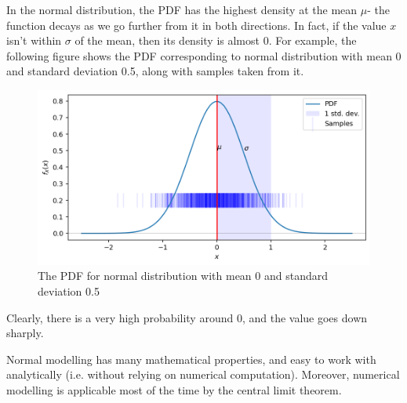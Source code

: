 \documentclass[a4paper, openany]{memoir}
\begin{document}
In the normal distribution, the PDF has the highest density at the mean $\mu$- the function decays as we go further from it in both directions. In fact, if the value $x$ isn't within $\sigma$ of the mean, then its density is almost 0. For example, the following figure shows the PDF corresponding to normal distribution with mean 0 and standard deviation 0.5, along with samples taken from it.
\begin{figure}[H]
    \centering
    \includegraphics[scale=0.5]{src/5.16 pdf normal distribution.png}
    \caption{The PDF for normal distribution with mean 0 and standard deviation 0.5}
\end{figure}
\noindent Clearly, there is a very high probability around 0, and the value goes down sharply.

Normal modelling has many mathematical properties, and easy to work with analytically (i.e. without relying on numerical computation). Moreover, numerical modelling is applicable most of the time by the central limit theorem.
\end{document}
